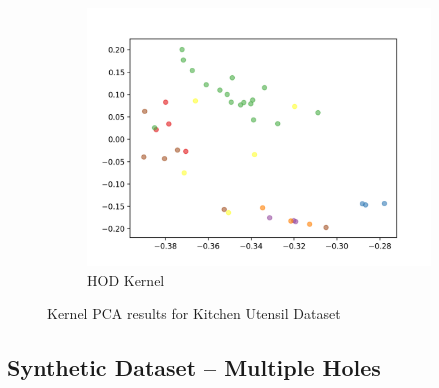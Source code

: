 \documentclass[10pt]{article}
\begin{document}
\begin{figure}[H]
\begin{subfigure}[h]{0.33\textwidth}
        \includegraphics[width=\linewidth]{DB_hod}
        \caption{HOD Kernel}
    \end{subfigure}%
    \caption{Kernel PCA results for Kitchen Utensil Dataset}
\end{figure}

\subsection{Synthetic Dataset -- Multiple Holes}
\end{document}

